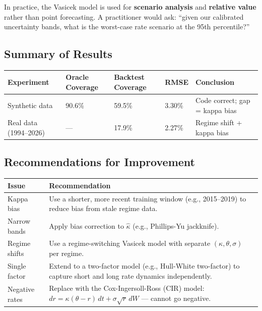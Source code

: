 \documentclass[11pt, letterpaper]{article}
\begin{document}
In practice, the Vasicek model is used for \textbf{scenario analysis} and
\textbf{relative value} rather than point forecasting. A practitioner would
ask: ``given our calibrated uncertainty bands, what is the worst-case rate
scenario at the 95th percentile?''

\subsection{Summary of Results}

\begin{center}
\begin{tabular}{@{}L{3.8cm}C{2.8cm}C{3cm}C{1.8cm}L{3cm}@{}}
  \toprule
  \textbf{Experiment} & \textbf{Oracle Coverage} & \textbf{Backtest Coverage} & \textbf{RMSE} & \textbf{Conclusion} \\
  \midrule
  Synthetic data        & 90.6\% & 59.5\% & 3.30\% & Code correct; gap = kappa bias \\
  Real data (1994--2026) & ---   & 17.9\% & 2.27\% & Regime shift + kappa bias \\
  \bottomrule
\end{tabular}
\end{center}

\subsection{Recommendations for Improvement}

\begin{center}
\begin{tabular}{@{}L{3.5cm}L{10cm}@{}}
  \toprule
  \textbf{Issue} & \textbf{Recommendation} \\
  \midrule
  Kappa bias
    & Use a shorter, more recent training window (e.g., 2015--2019) to reduce
      bias from stale regime data. \\[4pt]
  Narrow bands
    & Apply bias correction to $\hat{\kappa}$ (e.g., Phillips-Yu jackknife). \\[4pt]
  Regime shifts
    & Use a regime-switching Vasicek model with separate
      $(\kappa, \theta, \sigma)$ per regime. \\[4pt]
  Single factor
    & Extend to a two-factor model (e.g., Hull-White two-factor) to capture
      short and long rate dynamics independently. \\[4pt]
  Negative rates
    & Replace with the Cox-Ingersoll-Ross (CIR) model:
      $dr = \kappa(\theta - r)\,dt + \sigma\sqrt{r}\,dW$ --- cannot go
      negative. \\
  \bottomrule
\end{tabular}
\end{center}
\end{document}
